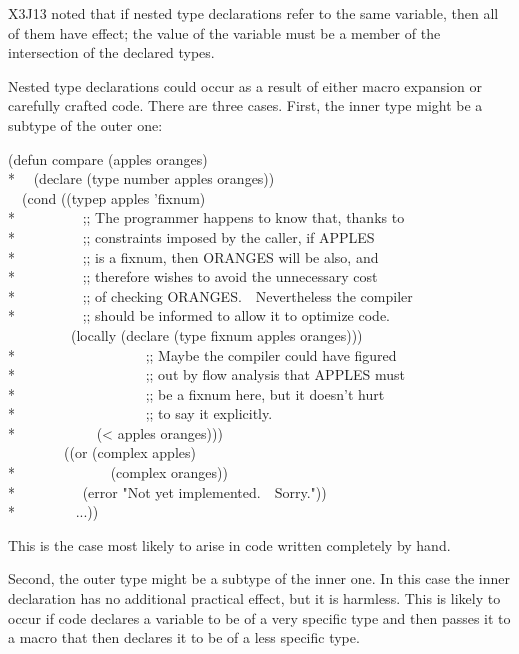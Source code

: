 \begin{flushdesc}
\begin{new}
X3J13 noted that if nested type declarations refer to the same variable,
then all of them have effect; the value of the variable must be a member of the
intersection of the declared types.

Nested type declarations could occur as a result of either macro expansion
or carefully crafted code.  There are three cases.  First,
the inner type might be a subtype of the outer one:
\begin{lisp}
(defun compare (apples oranges) \\*
~~(declare (type number apples oranges)) \\
~~(cond ((typep apples 'fixnum) \\*
~~~~~~~~~;; The programmer happens to know that, thanks to \\*
~~~~~~~~~;; constraints imposed by the caller, if APPLES \\*
~~~~~~~~~;; is a fixnum, then ORANGES will be also, and \\*
~~~~~~~~~;; therefore wishes to avoid the unnecessary cost \\*
~~~~~~~~~;; of checking ORANGES.~~Nevertheless the compiler \\*
~~~~~~~~~;; should be informed to allow it to optimize code. \\
~~~~~~~~~(locally (declare (type fixnum apples oranges))) \\*
~~~~~~~~~~~~~~~~~~;; Maybe the compiler could have figured \\*
~~~~~~~~~~~~~~~~~~;; out by flow analysis that APPLES must \\*
~~~~~~~~~~~~~~~~~~;; be a fixnum here, but it doesn't hurt \\*
~~~~~~~~~~~~~~~~~~;; to say it explicitly. \\*
~~~~~~~~~~~(< apples oranges))) \\
~~~~~~~~((or (complex apples) \\*
~~~~~~~~~~~~~(complex oranges)) \\*
~~~~~~~~~(error "Not yet implemented.~~Sorry.")) \\*
~~~~~~~~...))
\end{lisp}
This is the case most likely to arise in code written completely by hand.

Second, the outer type might be a subtype of the inner one.  In this
case the inner declaration has no additional practical effect, but
it is harmless.  This is
likely to occur if code declares a variable to be of a very specific type
and then passes it to a macro that then declares it to be of a less
specific type.


\end{new}
\end{flushdesc}
